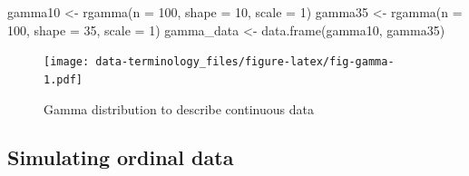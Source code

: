 \documentclass[
  letterpaper,
]{book}
\newenvironment{Shaded}{\begin{snugshade}}{\end{snugshade}}
\newcommand{\AttributeTok}[1]{\textcolor[rgb]{0.40,0.45,0.13}{#1}}
\newcommand{\DecValTok}[1]{\textcolor[rgb]{0.68,0.00,0.00}{#1}}
\newcommand{\FunctionTok}[1]{\textcolor[rgb]{0.28,0.35,0.67}{#1}}
\newcommand{\NormalTok}[1]{\textcolor[rgb]{0.00,0.23,0.31}{#1}}
\newcommand{\OtherTok}[1]{\textcolor[rgb]{0.00,0.23,0.31}{#1}}
\newcommand{\SpecialCharTok}[1]{\textcolor[rgb]{0.37,0.37,0.37}{#1}}
\newcommand{\StringTok}[1]{\textcolor[rgb]{0.13,0.47,0.30}{#1}}
\begin{document}
\begin{Shaded}
\begin{Highlighting}[]
\NormalTok{gamma10 }\OtherTok{\textless{}{-}} \FunctionTok{rgamma}\NormalTok{(}\AttributeTok{n =} \DecValTok{100}\NormalTok{, }\AttributeTok{shape =} \DecValTok{10}\NormalTok{, }\AttributeTok{scale =} \DecValTok{1}\NormalTok{)}
\NormalTok{gamma35 }\OtherTok{\textless{}{-}} \FunctionTok{rgamma}\NormalTok{(}\AttributeTok{n =} \DecValTok{100}\NormalTok{, }\AttributeTok{shape =} \DecValTok{35}\NormalTok{, }\AttributeTok{scale =} \DecValTok{1}\NormalTok{)}
\NormalTok{gamma\_data }\OtherTok{\textless{}{-}} \FunctionTok{data.frame}\NormalTok{(gamma10, gamma35)}
\end{Highlighting}
\end{Shaded}

\begin{Shaded}
\end{Shaded}

\begin{figure}

{\centering \texttt{[image: data-terminology\_files/figure-latex/fig-gamma-1.pdf]}

}

\caption{\label{fig-gamma}Gamma distribution to describe continuous
data}

\end{figure}

\hypertarget{simulating-ordinal-data}{%
\subsection{Simulating ordinal data}\label{simulating-ordinal-data}}
\end{document}
